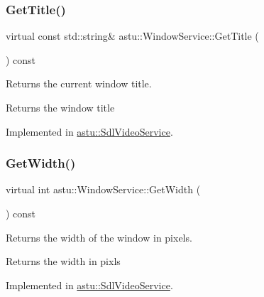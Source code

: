 \mbox{\label{classastu_1_1WindowService_a54815692f9d3086673dd2694d75dcb65}} 
\subsubsection{\texorpdfstring{Get\+Title()}{GetTitle()}}
{\footnotesize\ttfamily virtual const std\+::string\& astu\+::\+Window\+Service\+::\+Get\+Title (\begin{DoxyParamCaption}{ }\end{DoxyParamCaption}) const\hspace{0.3cm}{\ttfamily [pure virtual]}}

Returns the current window title.

\begin{DoxyReturn}{Returns}
the window title 
\end{DoxyReturn}


Implemented in \hyperlink{classastu_1_1SdlVideoService_ad6ee7f7a409960e91ddd77bbcea6432f}{astu\+::\+Sdl\+Video\+Service}.

\mbox{\label{classastu_1_1WindowService_ad2e75e91b0d72afb92c980fcbd8f227a}} 
\subsubsection{\texorpdfstring{Get\+Width()}{GetWidth()}}
{\footnotesize\ttfamily virtual int astu\+::\+Window\+Service\+::\+Get\+Width (\begin{DoxyParamCaption}{ }\end{DoxyParamCaption}) const\hspace{0.3cm}{\ttfamily [pure virtual]}}

Returns the width of the window in pixels.

\begin{DoxyReturn}{Returns}
the width in pixls 
\end{DoxyReturn}


Implemented in \hyperlink{classastu_1_1SdlVideoService_a45c3181611e718bcfe44862baed6d520}{astu\+::\+Sdl\+Video\+Service}.

